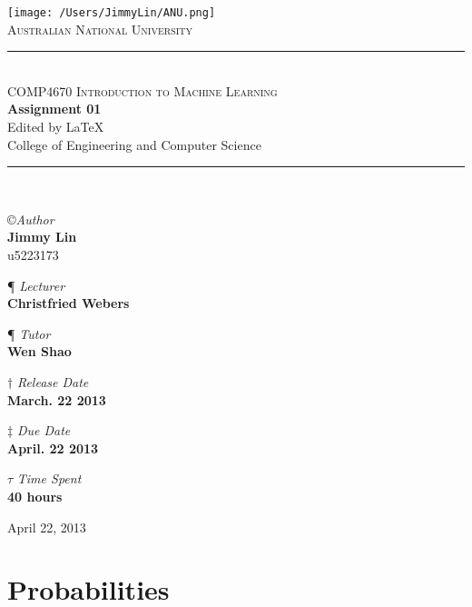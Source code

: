 \documentclass[11pt,a4paper]{article}
\newcommand{\AUTHOR}{Jimmy Lin}
\newcommand{\UID}{u5223173}
\newcommand{\UNIVERSITY}{Australian National University}
\newcommand{\COLLEGE}{College of Engineering and Computer Science}
\newcommand{\COURSE}{COMP4670 Introduction to Machine Learning}
\newcommand{\LECTURER}{Christfried Webers}
\newcommand{\TUTOR}{Wen Shao}
\newcommand{\TASK}{Assignment 01}
\newcommand{\RELEASEDATE}{March. 22 2013}
\newcommand{\DUEDATE}{April. 22 2013}
\newcommand{\TIMECONSUME}{40 hours}
\begin{document}
\begin{titlepage}
    \begin{center}
        \vspace*{0.5cm}
\texttt{[image: /Users/JimmyLin/ANU.png]}\\[1cm]
\textsc{\LARGE \UNIVERSITY}\\[1.2cm]

\rule{\linewidth}{0.5mm} \\[0.4cm]
{ \textsc{\Large \COURSE}\\[0.5cm]
 \huge \bfseries \TASK}\\[0.4cm]
 \footnotesize Edited by \LaTeX \\[0.25cm]
 \normalsize{\COLLEGE}
\rule{\linewidth}{0.5mm} \\[2cm]

\begin{center}
\copyright \emph{\large Author} \\
\Large \textbf{\AUTHOR} \\ \UID \vspace*{0.6cm}

\P \emph{ Lecturer} \\
\Large \textbf{\LECTURER} \vspace*{0.6cm}

\P \emph{ Tutor} \\
\Large \textbf{\TUTOR} \vspace*{0.6cm}

$\dagger$ \emph{Release Date}  \\
\Large \textbf{\RELEASEDATE} \vspace*{0.6cm} 

$\ddagger$ \emph{Due Date}  \\
\Large \textbf{\DUEDATE} \vspace*{0.6cm}

$\tau$ \emph{Time Spent} \\
\Large \textbf{\TIMECONSUME} \vspace*{0.6cm} 
\end{center}
\vfill
{\large April 22, 2013}
\end{center}
\end{titlepage}

\begin{center} \tableofcontents \end{center}
 \newpage
\section{Probabilities}
\end{document}

